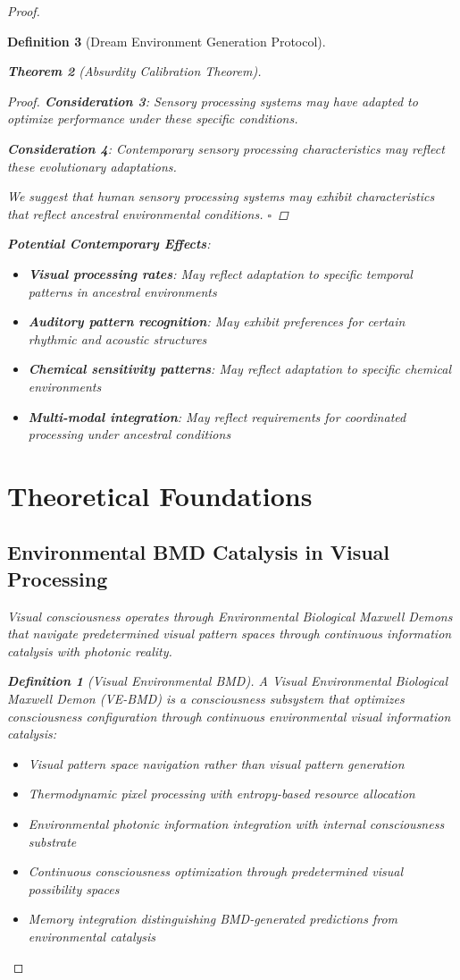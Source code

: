 \documentclass[12pt,a4paper]{article}
\newtheorem{theorem}{Theorem}[section]
\newtheorem{definition}[theorem]{Definition}
\begin{document}
\begin{proof}
\begin{definition}[Dream Environment Generation Protocol]
\begin{theorem}[Absurdity Calibration Theorem]
\begin{proof}
\textbf{Consideration 3}: Sensory processing systems may have adapted to optimize performance under these specific conditions.

\textbf{Consideration 4}: Contemporary sensory processing characteristics may reflect these evolutionary adaptations.

We suggest that human sensory processing systems may exhibit characteristics that reflect ancestral environmental conditions. $\square$
\end{proof}

\textbf{Potential Contemporary Effects}:
\begin{itemize}
\item \textbf{Visual processing rates}: May reflect adaptation to specific temporal patterns in ancestral environments
\item \textbf{Auditory pattern recognition}: May exhibit preferences for certain rhythmic and acoustic structures
\item \textbf{Chemical sensitivity patterns}: May reflect adaptation to specific chemical environments
\item \textbf{Multi-modal integration}: May reflect requirements for coordinated processing under ancestral conditions
\end{itemize}

\section{Theoretical Foundations}

\subsection{Environmental BMD Catalysis in Visual Processing}

Visual consciousness operates through Environmental Biological Maxwell Demons that navigate predetermined visual pattern spaces through continuous information catalysis with photonic reality.

\begin{definition}[Visual Environmental BMD]
A Visual Environmental Biological Maxwell Demon (VE-BMD) is a consciousness subsystem that optimizes consciousness configuration through continuous environmental visual information catalysis:
\begin{itemize}
\item Visual pattern space navigation rather than visual pattern generation
\item Thermodynamic pixel processing with entropy-based resource allocation
\item Environmental photonic information integration with internal consciousness substrate
\item Continuous consciousness optimization through predetermined visual possibility spaces
\item Memory integration distinguishing BMD-generated predictions from environmental catalysis
\end{itemize}
\end{definition}


\end{theorem}
\end{definition}
\end{proof}
\end{document}

